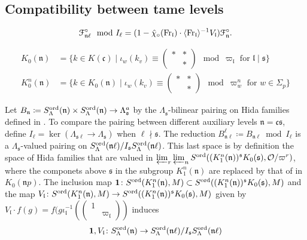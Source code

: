 \documentclass[leqno]{amsart}
\theoremstyle{definition}
\theoremstyle{remark}
\newcommand{\smat}[1]{\left(\begin{smallmatrix} #1 \end{smallmatrix}\right)}
\newcommand{\id}{\mathbf{1}}
\newcommand{\oo}{\mathcal{O}}
\newcommand{\Fr}{\textnormal{Fr}} %
\newcommand{\fc}{\mathfrak{c}}
\newcommand{\fl}{\mathfrak{l}}
\newcommand{\fn}{\mathfrak{n}}
\newcommand{\fs}{\mathfrak{s}}
\newcommand{\euF}{\EuScript{F}} %
\newcommand{\ord}{\textnormal{ord}} %
\begin{document}
\subsection{Compatibility between tame levels}



\begin{equation*}
	 \euF^\circ_{\fn\ell} \mod I_{\ell}=
	(1-\hat{\chi}_\circ(\Fr_\fl)\cdot 
	\langle \Fr_\fl\rangle^{-1} V_\fl)
	\euF^\circ_{\fn}.
\end{equation*}



\begin{align*}
	K_0(\fn)&=
	\{
	k\in K(\fc)\mid
	\iota_{w}(k_v)\equiv
	(\begin{smallmatrix}
		*&*\\&*
	\end{smallmatrix})\mod \varpi_\fl
	\text{ for } \fl\mid \fs
	\}\\
	K_0^n(\fn)&=
	\{
	k\in K_0(\fn)\mid
	\iota_{w}(k_v)\equiv
	(\begin{smallmatrix}
		*&*\\&*
	\end{smallmatrix})\mod \varpi_w^n
	\text{ for } w\in \Sigma_p
	\}
\end{align*}


Let $B_\fn\coloneqq S_\Lambda^{\ord}(\fn)\times
S_\Lambda^{\ord}(\fn)\to \Lambda_{\fs}^a$ 
by the $\Lambda_{\fs}$-bilinear pairing
on Hida families defined in \cite[\S 6.4.1]{lee}.
To compare the pairing between different
auxiliary levels $\fn=\fc\fs$,
define $I_{\ell}=\ker(\Lambda_{\fs\ell}\to \Lambda_{\fs})$
when $\ell\nmid \fs$.
The reduction 
$B_{\fn\ell}^{\ell}\coloneqq B_{\fn\ell}\bmod I_\ell$
is a $\Lambda_{\fs}$-valued pairing on 
$S_\Lambda^{\ord}(\fn\ell)/I_\fs S_\Lambda^{\ord}(\fn\ell)$.
This last space is by definition
the space of Hida families that are valued 
in $\varprojlim_r\varprojlim_n 
S^{\ord}((K^n_1(\fn))^{\fs}K_0(\fs),\oo/\varpi^r)$,
where the componets above $\fs$ in the subgroup $K^n_1(\fn)$
are replaced by that of in $K_0(\fn p)$.
The inclusion map 
$\id\colon S^{\ord}(K^n_1(\fn),M)\subset
S^{\ord}((K^n_1(\fn))^{\fs}K_0(\fs),M)$
and the map
$V_{\fl}\colon S^{\ord}(K^n_1(\fn),M)\to
S^{\ord}((K^n_1(\fn))^{\fs}K_0(\fs),M)$
given by $V_\fl\cdot f(g)=
f(g\iota_\fl^{-1}(\smat{1&\\&\varpi_\fl})$ induces
\[
\id, V_\fl\colon S^{\ord}_{\Lambda}(\fn)\to
S_\Lambda^{\ord}(\fn\ell)/I_\fs S_\Lambda^{\ord}(\fn\ell)
\]
\end{document}
